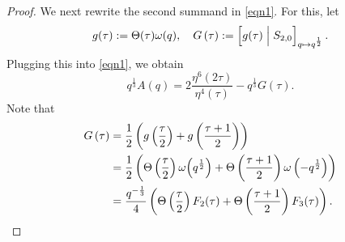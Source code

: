 \documentclass[12pt,reqno]{amsart}
\renewcommand{\o}{{\omega}}
\renewcommand{\t}{\tau}
\renewcommand{\(}{\left\(}
\renewcommand{\)}{\right\)}
\numberwithin{equation}{section}
\theoremstyle{plain}
\theoremstyle{definition}
\numberwithin{equation}{section}
\begin{document}
\begin{proof}
We next rewrite the second summand in \eqref{eqn1}. For this, let
\[
g(\t):=\Theta(\t)\o(q),\quad G\left(\t\right):=\left[g(\t)\Bigm|S_{2,0}\right]_{q\mapsto q^{\frac 12}}. %
\] 
Plugging this into \eqref{eqn1}, we obtain 
\begin{equation*}%
q^{\frac 13}A\!\left(q\right)=2\frac{\eta^6\left(2\t\right)}{\eta^4(\t)}-q^{\frac 13}G(\t).
\end{equation*}
Note that 
\begin{align*}%
G\left(\t\right)%
&=\frac 12\left(g\left(\frac{\t}{2}\right)+g\left(\frac{\t+1}{2}\right)\right)\nonumber\\
&=\frac 12\left(\Theta\left(\frac{\t}{2}\right)\omega\Bigl(q^{\frac{1}{2}}\Bigr)+\Theta\left(\frac{\t+1}{2}\right)\omega\left(-q^{\frac 12}\right)\right)\nonumber\\
&=\frac{q^{-\frac 13}}{4}\left(\Theta\left(\frac{\t}{2}\right)F_2(\t)+\Theta\left(\frac{\t+1}{2}\right)F_3(\t)\right).
\end{align*}


\end{proof}
\end{document}
